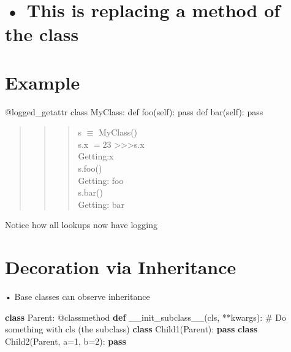 \documentclass[
  letterpaper,
  DIV=11,
  numbers=noendperiod]{scrreprt}
\newenvironment{Shaded}{\begin{snugshade}}{\end{snugshade}}
\newcommand{\CommentTok}[1]{\textcolor[rgb]{0.37,0.37,0.37}{#1}}
\newcommand{\ControlFlowTok}[1]{\textcolor[rgb]{0.00,0.23,0.31}{\textbf{#1}}}
\newcommand{\DecValTok}[1]{\textcolor[rgb]{0.68,0.00,0.00}{#1}}
\newcommand{\FunctionTok}[1]{\textcolor[rgb]{0.28,0.35,0.67}{#1}}
\newcommand{\KeywordTok}[1]{\textcolor[rgb]{0.00,0.23,0.31}{\textbf{#1}}}
\newcommand{\NormalTok}[1]{\textcolor[rgb]{0.00,0.23,0.31}{#1}}
\newcommand{\OperatorTok}[1]{\textcolor[rgb]{0.37,0.37,0.37}{#1}}
\begin{document}

\chapter{• This is replacing a method of the
class}\label{this-is-replacing-a-method-of-the-class}


\chapter{Example}\label{example-5}

\begin{Shaded}
\begin{Highlighting}[]
\NormalTok{@logged\_getattr class MyClass: def foo(self): pass def bar(self): pass }
\end{Highlighting}
\end{Shaded}

\begin{quote}
\begin{quote}
\begin{quote}
s \(\equiv\) MyClass()\\
s.x \(= 23\) \textgreater\textgreater\textgreater s.x\\
Getting:x\\
s.foo()\\
Getting: foo\\
s.bar()\\
Getting: bar
\end{quote}
\end{quote}
\end{quote}

Notice how all lookups now have logging


\chapter{Decoration via Inheritance}\label{decoration-via-inheritance}

• Base classes can observe inheritance

\begin{Shaded}
\begin{Highlighting}[]
\KeywordTok{class}\NormalTok{ Parent: }\OperatorTok{@}\NormalTok{classmethod }\KeywordTok{def} \FunctionTok{\_\_init\_subclass\_\_}\NormalTok{(cls, }\OperatorTok{**}\NormalTok{kwargs): }\CommentTok{\# Do something with cls (the subclass)   }
\KeywordTok{class}\NormalTok{ Child1(Parent): }\ControlFlowTok{pass}   
\KeywordTok{class}\NormalTok{ Child2(Parent, a}\OperatorTok{=}\DecValTok{1}\NormalTok{, b}\OperatorTok{=}\DecValTok{2}\NormalTok{): }\ControlFlowTok{pass} 
\end{Highlighting}
\end{Shaded}
\end{document}
